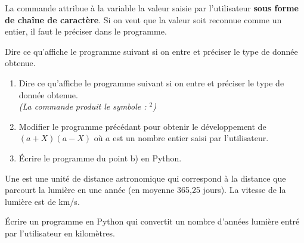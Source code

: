 \begin{remarque}
La commande  attribue à la variable  la valeur saisie par l'utilisateur \textbf{sous forme de chaîne de caractère}. Si on veut que la valeur soit reconnue comme un entier, il faut le préciser dans le programme.
\end{remarque}

\medskip
\begin{boxexstheorieligne}
\exo
Dire ce qu'affiche le programme suivant si on entre  et préciser le type de donnée obtenue.

\vspace{-3mm}
\begin{center}
\end{center}




\vspace{2mm}




\exo\vspace{-7mm}
\begin{enumerate}[label=\alph*),itemsep=0mm]
\item 
Dire ce qu'affiche le programme suivant si on entre  et préciser le type de donnée obtenue.\\
\textit{\small(La commande} {\small{}} \textit{\small produit le symbole : $^2$)}





\item 
Modifier le programme précédant pour obtenir le développement de $(a+X)(a-X)$ où $a$ est un nombre entier saisi par l'utilisateur.




\item 
Écrire le programme du point b) en Python.
\end{enumerate}




\eexo




\exo
Une  est une unité de distance astronomique qui correspond à la distance que parcourt la lumière en une année (en moyenne 365,25 jours). La vitesse de la lumière est de  km/s. 

\smallskip
Écrire un programme en Python qui convertit un nombre d'années lumière entré par l'utilisateur en kilomètres. 





\end{boxexstheorieligne}
